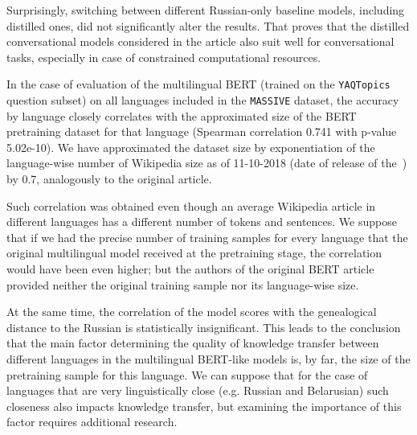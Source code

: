 Surprisingly, switching between different Russian-only baseline models, including distilled ones, did not significantly alter the results. That proves that the distilled conversational models considered in the article also suit well for conversational tasks, especially in case of constrained computational resources.

In the case of evaluation of the multilingual BERT (trained on the \texttt{YAQTopics} question subset) on all languages included in the \texttt{MASSIVE} dataset, the accuracy by language closely correlates with the approximated size of the BERT pretraining dataset for that language (Spearman correlation 0.741 with p-value 5.02e-10). We have approximated the dataset size by exponentiation of the language-wise number of Wikipedia size as of 11-10-2018 (date of release of the~\cite{bert}) by 0.7, analogously to the original article. 

 Such correlation was obtained even though an average Wikipedia article in different languages has a different number of tokens and sentences. We suppose that if we had the precise number of training samples for every language that the original multilingual model received at the pretraining stage, the correlation would have been even higher; but the authors of the original BERT article provided neither the original training sample nor its language-wise size. 

 At the same time, the correlation of the model scores with the genealogical distance to the Russian is statistically insignificant. This leads to the conclusion that the main factor determining the quality of knowledge transfer between different languages in the multilingual BERT-like models is, by far, the size of the pretraining sample for this language. We can suppose that for the case of languages that are very linguistically close (e.g. Russian and Belarusian) such closeness also impacts knowledge transfer, but examining the importance of this factor requires additional research. 


